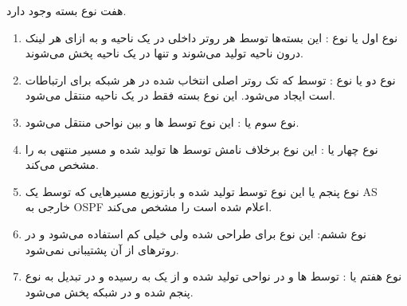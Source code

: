 \documentclass[12pt]{article}
\begin{document}
هفت نوع بسته  وجود دارد.

\begin{enumerate}
	\item نوع اول یا نوع : این بسته‌ها توسط هر روتر داخلی در یک ناحیه و به ازای هر لینک درون ناحیه تولید می‌شوند و تنها در یک ناحیه پخش می‌شوند.
	
	\item نوع دو یا نوع : توسط  که تک روتر اصلی انتخاب شده در هر شبکه برای ارتباطات  است ایجاد می‌شود. این نوع بسته فقط در یک ناحیه منتقل می‌شود.
	
	
	\item نوع سوم یا 
	:
	این نوع توسط  ها و بین نواحی منتقل می‌شود.
	
	\item نوع چهار یا
	:
	این نوع برخلاف نامش توسط  ها تولید شده و مسیر منتهی به  را مشخص می‌کند.
	
	\item نوع پنجم یا 
	این نوع توسط  تولید شده و بازتوزیع مسیر‌هایی که توسط یک AS خارجی به OSPF اعلام شده است را مشخص  می‌کند.
	
	\item نوع ششم: این نوع برای  طراحی شده ولی خیلی کم استفاده می‌شود و در روترهای  از آن پشتیبانی نمی‌شود.
	
	\item نوع هفتم یا :
توسط  ها و در نواحی
تولید شده و از یک 
به
رسیده و در  تبدیل به نوع پنجم شده و در شبکه پخش می‌شود.

\end{enumerate}
\end{document}
